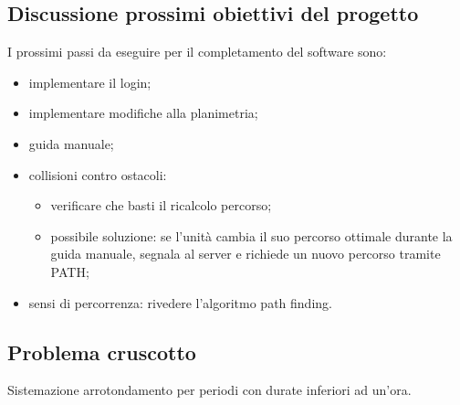 \subsection{Discussione prossimi obiettivi del progetto}
I prossimi passi da eseguire per il completamento del software sono:
	\begin{itemize}
		\item implementare il login;
		\item implementare modifiche alla planimetria;
		\item guida manuale;
		\item collisioni contro ostacoli:
		\begin{itemize}
			\item verificare che basti il ricalcolo percorso;
			\item possibile soluzione: se l'unità cambia il suo percorso ottimale durante la guida manuale, segnala al server e richiede un nuovo percorso tramite PATH;
		\end{itemize}
		\item sensi di percorrenza: rivedere l'algoritmo path finding.
	\end{itemize}
\subsection{Problema cruscotto}
Sistemazione arrotondamento per periodi con durate inferiori ad un'ora.